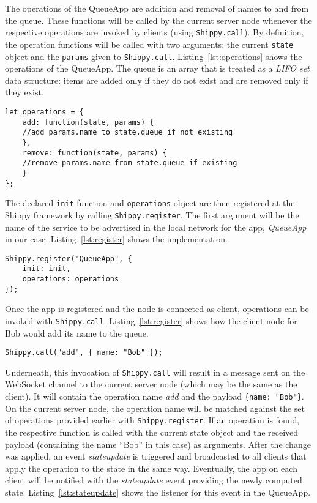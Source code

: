 The operations of the QueueApp are addition and removal of names to and from the queue.
These functions will be called by the current server node whenever the respective operations are invoked by clients (using \texttt{Shippy.call}).
By definition, the operation functions will be called with two arguments: the current \texttt{state} object and the \texttt{params} given to \texttt{Shippy.call}.
Listing~\ref{lst:operations} shows the operations of the QueueApp.
The queue is an array that is treated as a \textit{LIFO set} data structure: items are added only if they do not exist and are removed only if they exist.

\begin{lstlisting}[caption={QueueApp operations},label={lst:operations}]
let operations = {
    add: function(state, params) {
    //add params.name to state.queue if not existing
    },
    remove: function(state, params) {
    //remove params.name from state.queue if existing
    }
};
\end{lstlisting}

The declared \texttt{init} function and \texttt{operations} object are then registered at the Shippy framework by calling \texttt{Shippy.register}.
The first argument will be the name of the service to be advertised in the local network for the app, \textit{QueueApp} in our case.
Listing~\ref{lst:register} shows the implementation.

\begin{lstlisting}[caption={Shippy.register},label={lst:register}]
Shippy.register("QueueApp", {
    init: init,
    operations: operations
});
\end{lstlisting}

Once the app is registered and the node is connected as client, operations can be invoked with \texttt{Shippy.call}. Listing~\ref{lst:register} shows how the client node for Bob would add its name to the queue.
\begin{lstlisting}[caption={Shippy.call},label={lst:call}]
Shippy.call("add", { name: "Bob" });
\end{lstlisting}

Underneath, this invocation of \texttt{Shippy.call} will result in a message sent on the WebSocket channel to the current server node (which may be the same as the client).
It will contain the operation name \textit{add} and the payload \texttt{\{name: "Bob"\}}.
On the current server node, the operation name will be matched against the set of operations provided earlier with \texttt{Shippy.register}.
If an operation is found, the respective function is called with the current state object and the received payload (containing the name ``Bob'' in this case) as arguments.
After the change was applied, an event \textit{stateupdate} is triggered and broadcasted to all clients that apply the operation to the state in the same way.
Eventually, the app on each client will be notified with the \textit{stateupdate} event providing the newly computed state.
Listing~\ref{lst:stateupdate} shows the listener for this event in the QueueApp.

